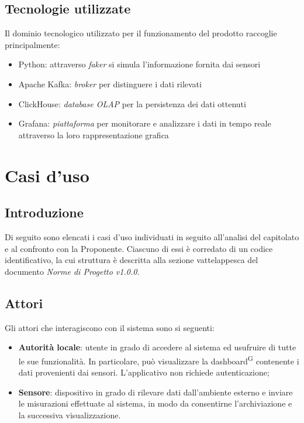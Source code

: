 \documentclass[8pt]{article}
\newcommand{\glossterm}[1]{#1\textsuperscript{G}} %
\begin{document}
\begin{itemize}
\subsection{Tecnologie utilizzate}
Il dominio tecnologico utilizzato per il funzionamento del prodotto raccoglie principalmente:
\begin{itemize}
	\setlength\itemsep{0em}
	\item Python: attraverso \textit{faker} si simula l'informazione fornita dai sensori
	\item Apache Kafka: \textit{broker} per distinguere i dati rilevati
	\item ClickHouse: \textit{database OLAP} per la persistenza dei dati ottenuti
	\item Grafana: \textit{piattaforma} per monitorare e analizzare i dati in tempo reale attraverso la loro rappresentazione grafica
\end{itemize}
\newpage

\section{Casi d'uso} \label{sec:use-case}
\subsection{Introduzione}
Di seguito sono elencati i casi d'uso individuati in seguito all'analisi del capitolato e al confronto con la Proponente. Ciascuno di essi è corredato di un codice identificativo, la cui struttura è descritta alla sezione vattelappesca del documento \textit{Norme di Progetto v1.0.0}. %
\subsection{Attori}
Gli attori che interagiscono con il sistema sono si seguenti:
\begin{itemize}
    \item \textbf{Autorità locale}: utente in grado di accedere al sistema ed usufruire di tutte le sue funzionalità. In particolare, può visualizzare la \glossterm{dashboard} contenente i dati provenienti dai sensori. L'applicativo non richiede autenticazione; %
    \item \textbf{Sensore}: dispositivo in grado di rilevare dati dall'ambiente esterno e inviare le misurazioni effettuate al sistema, in modo da consentirne l'archiviazione e la successiva visualizzazione.
\end{itemize}


\end{itemize}
\end{document}
